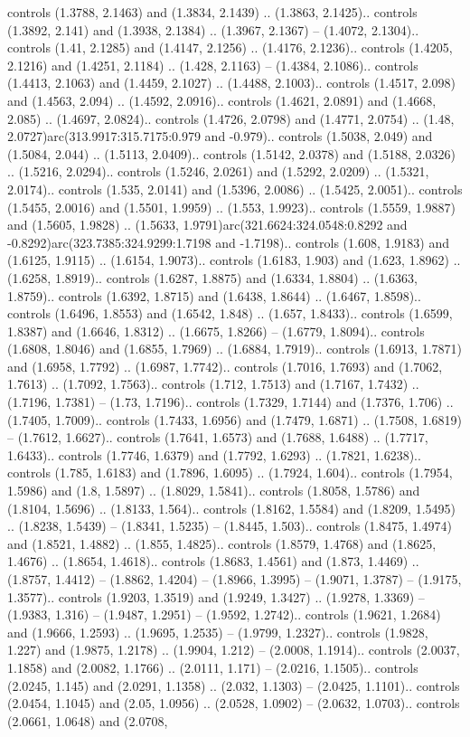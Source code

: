 controls (1.3788, 2.1463) and (1.3834, 2.1439) .. (1.3863, 2.1425).. controls (1.3892, 2.141) and (1.3938, 2.1384) .. (1.3967, 2.1367) -- (1.4072, 2.1304).. controls (1.41, 2.1285) and (1.4147, 2.1256) .. (1.4176, 2.1236).. controls (1.4205, 2.1216) and (1.4251, 2.1184) .. (1.428, 2.1163) -- (1.4384, 2.1086).. controls (1.4413, 2.1063) and (1.4459, 2.1027) .. (1.4488, 2.1003).. controls (1.4517, 2.098) and (1.4563, 2.094) .. (1.4592, 2.0916).. controls (1.4621, 2.0891) and (1.4668, 2.085) .. (1.4697, 2.0824).. controls (1.4726, 2.0798) and (1.4771, 2.0754) .. (1.48, 2.0727)arc(313.9917:315.7175:0.979 and -0.979).. controls (1.5038, 2.049) and (1.5084, 2.044) .. (1.5113, 2.0409).. controls (1.5142, 2.0378) and (1.5188, 2.0326) .. (1.5216, 2.0294).. controls (1.5246, 2.0261) and (1.5292, 2.0209) .. (1.5321, 2.0174).. controls (1.535, 2.0141) and (1.5396, 2.0086) .. (1.5425, 2.0051).. controls (1.5455, 2.0016) and (1.5501, 1.9959) .. (1.553, 1.9923).. controls (1.5559, 1.9887) and (1.5605, 1.9828) .. (1.5633, 1.9791)arc(321.6624:324.0548:0.8292 and -0.8292)arc(323.7385:324.9299:1.7198 and -1.7198).. controls (1.608, 1.9183) and (1.6125, 1.9115) .. (1.6154, 1.9073).. controls (1.6183, 1.903) and (1.623, 1.8962) .. (1.6258, 1.8919).. controls (1.6287, 1.8875) and (1.6334, 1.8804) .. (1.6363, 1.8759).. controls (1.6392, 1.8715) and (1.6438, 1.8644) .. (1.6467, 1.8598).. controls (1.6496, 1.8553) and (1.6542, 1.848) .. (1.657, 1.8433).. controls (1.6599, 1.8387) and (1.6646, 1.8312) .. (1.6675, 1.8266) -- (1.6779, 1.8094).. controls (1.6808, 1.8046) and (1.6855, 1.7969) .. (1.6884, 1.7919).. controls (1.6913, 1.7871) and (1.6958, 1.7792) .. (1.6987, 1.7742).. controls (1.7016, 1.7693) and (1.7062, 1.7613) .. (1.7092, 1.7563).. controls (1.712, 1.7513) and (1.7167, 1.7432) .. (1.7196, 1.7381) -- (1.73, 1.7196).. controls (1.7329, 1.7144) and (1.7376, 1.706) .. (1.7405, 1.7009).. controls (1.7433, 1.6956) and (1.7479, 1.6871) .. (1.7508, 1.6819) -- (1.7612, 1.6627).. controls (1.7641, 1.6573) and (1.7688, 1.6488) .. (1.7717, 1.6433).. controls (1.7746, 1.6379) and (1.7792, 1.6293) .. (1.7821, 1.6238).. controls (1.785, 1.6183) and (1.7896, 1.6095) .. (1.7924, 1.604).. controls (1.7954, 1.5986) and (1.8, 1.5897) .. (1.8029, 1.5841).. controls (1.8058, 1.5786) and (1.8104, 1.5696) .. (1.8133, 1.564).. controls (1.8162, 1.5584) and (1.8209, 1.5495) .. (1.8238, 1.5439) -- (1.8341, 1.5235) -- (1.8445, 1.503).. controls (1.8475, 1.4974) and (1.8521, 1.4882) .. (1.855, 1.4825).. controls (1.8579, 1.4768) and (1.8625, 1.4676) .. (1.8654, 1.4618).. controls (1.8683, 1.4561) and (1.873, 1.4469) .. (1.8757, 1.4412) -- (1.8862, 1.4204) -- (1.8966, 1.3995) -- (1.9071, 1.3787) -- (1.9175, 1.3577).. controls (1.9203, 1.3519) and (1.9249, 1.3427) .. (1.9278, 1.3369) -- (1.9383, 1.316) -- (1.9487, 1.2951) -- (1.9592, 1.2742).. controls (1.9621, 1.2684) and (1.9666, 1.2593) .. (1.9695, 1.2535) -- (1.9799, 1.2327).. controls (1.9828, 1.227) and (1.9875, 1.2178) .. (1.9904, 1.212) -- (2.0008, 1.1914).. controls (2.0037, 1.1858) and (2.0082, 1.1766) .. (2.0111, 1.171) -- (2.0216, 1.1505).. controls (2.0245, 1.145) and (2.0291, 1.1358) .. (2.032, 1.1303) -- (2.0425, 1.1101).. controls (2.0454, 1.1045) and (2.05, 1.0956) .. (2.0528, 1.0902) -- (2.0632, 1.0703).. controls (2.0661, 1.0648) and (2.0708, 